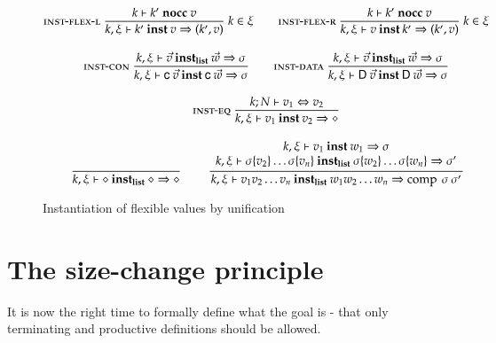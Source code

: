 \begin{figure}
\begin{gather*}
\mbox{\sc inst-flex-l}\ \dfrac{k\vdash k'\mbox{ \textbf{nocc} }v}{k,\xi\vdash k'\:\mathbf{inst}\:v\Rightarrow (k',v)}
{\; k \in \xi }
\qquad
\mbox{\sc inst-flex-r}\ \dfrac{k\vdash k'\mbox{ \textbf{nocc} }v}{k,\xi\vdash v\:\mathbf{inst}\:k'\Rightarrow (k',v)}
{\; k \in \xi}
\\[2ex]
\mbox{\sc inst-con}\ \dfrac{{k,\xi\vdash\vec{v}\:\mathbf{inst_{list}}\:\vec{w}\Rightarrow \sigma}}{k,\xi\vdash\mathsf{c} \: \vec{v}\:\mathbf{inst}\:\mathsf{c} \: \vec{w}\Rightarrow \sigma
}
\qquad
\mbox{\sc inst-data}\ \dfrac{{k,\xi\vdash\vec{v}\:\mathbf{inst_{list}}\:\vec{w}\Rightarrow \sigma}}{k,\xi\vdash\mathsf{D} \: \vec{v}\:\mathbf{inst}\:\mathsf{D} \: \vec{w}\Rightarrow \sigma
}
\\[2ex]
\mbox{\sc inst-eq}\ \dfrac{k;N\vdash v_1\Leftrightarrow v_2}{k,\xi\vdash v_1\:\mathbf{inst}\:v_2\Rightarrow \diamond
}
\\[2ex]
\ \dfrac{}{k,\xi\vdash\diamond\:\mathbf{inst_{list}}\:\diamond\Rightarrow \diamond}
\qquad
\ \dfrac{\begin{array}[b]{c}k,\xi\vdash v_1\:\mathbf{inst}\:w_1\Rightarrow \sigma\\k,\xi\vdash\sigma\{v_2\} \ldots \sigma\{v_n\}\:\mathbf{inst_{list}}\:\sigma\{w_2\} \ldots \sigma\{w_n\}\Rightarrow \sigma'\end{array}}{k,\xi\vdash v_1 v_2 \ldots v_n\:\mathbf{inst_{list}}\:w_1 w_2 \ldots w_n\Rightarrow \operatorname{comp}\:\sigma\:\sigma'}
\end{gather*}
\caption{Instantiation of flexible values by unification}
\end{figure}

\chapter{The size-change principle}

It is now the right time to formally define what the goal is - that only terminating and productive definitions should be allowed.
